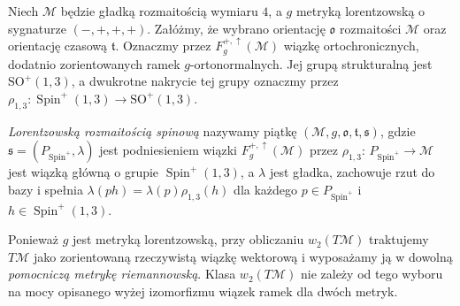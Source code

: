 \begin{definicja}
\label{def:lorentzowska-rozmaitosc-spinowa}
Niech $\mathcal M$ będzie gładką rozmaitością wymiaru $4$,
a $g$ metryką lorentzowską o sygnaturze $(-,+,+,+)$.
Załóżmy, że wybrano orientację $\mathfrak o$ rozmaitości
$\mathcal M$ oraz orientację czasową $\mathfrak t$.
Oznaczmy przez $F^{+,\uparrow}_g(\mathcal M)$ wiązkę
ortochronicznych, dodatnio zorientowanych ramek
$g$-ortonormalnych. Jej grupą strukturalną jest
$\mathrm{SO}^+(1,3)$, a dwukrotne nakrycie tej grupy
oznaczmy przez
$\rho_{1,3}:\operatorname{Spin}^+(1,3)\to\mathrm{SO}^+(1,3)$.

\emph{Lorentzowską rozmaitością spinową} nazywamy
piątkę $(\mathcal M,g,\mathfrak o,\mathfrak t,\mathfrak s)$,
gdzie $\mathfrak s=(P_{\operatorname{Spin}^+},\lambda)$
jest podniesieniem wiązki $F^{+,\uparrow}_g(\mathcal M)$
przez $\rho_{1,3}$: $P_{\operatorname{Spin}^+}\to\mathcal M$
jest wiązką główną o grupie $\operatorname{Spin}^+(1,3)$,
a $\lambda$ jest gładka, zachowuje rzut do bazy
i spełnia $\lambda(ph)=\lambda(p)\rho_{1,3}(h)$
dla każdego $p\in P_{\operatorname{Spin}^+}$
i $h\in\operatorname{Spin}^+(1,3)$.
\end{definicja}

Ponieważ $g$ jest metryką lorentzowską, przy obliczaniu
$w_2(T\mathcal M)$ traktujemy $T\mathcal M$ jako zorientowaną
rzeczywistą wiązkę wektorową i wyposażamy ją w dowolną
\emph{pomocniczą metrykę riemannowską}. Klasa $w_2(T\mathcal M)$
nie zależy od tego wyboru na mocy opisanego wyżej
izomorfizmu wiązek ramek dla dwóch metryk.

